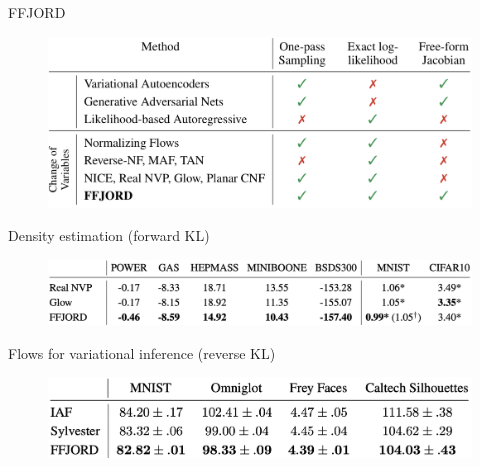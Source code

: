 \begin{frame}{FFJORD}
	\begin{figure}
		\centering
		\includegraphics[width=0.75\linewidth]{figs/flow_comparison.png}
	\end{figure}
	\vspace{-0.4cm}
	\begin{block}{Density estimation (forward KL)}
		\vspace{-0.2cm}
		\begin{figure}
			\centering
			\includegraphics[width=0.8\linewidth]{figs/ffjord_forward}
		\end{figure}
		\vspace{-0.5cm}
	\end{block}
	\begin{block}{Flows for variational inference (reverse KL)}
		\vspace{-0.2cm}
		\begin{figure}
			\centering
			\includegraphics[width=0.8\linewidth]{figs/ffjord_reverse}
		\end{figure}
	\end{block}

\end{frame}
